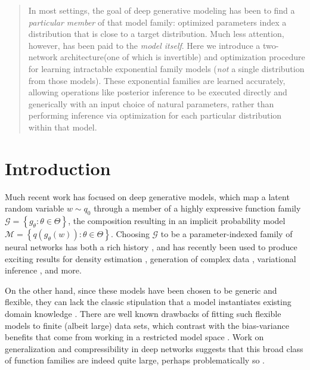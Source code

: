 \documentclass{article}
\begin{document}
\begin{abstract}
In most settings, the goal of deep generative modeling has been to find a \emph{particular member} of that model family: optimized parameters index a distribution that is close to a target distribution.  Much less attention, however, has been paid to the \emph{model itself}.   Here we introduce a two-network architecture(one of which is invertible) and optimization procedure for learning intractable exponential family models (\emph{not} a single distribution from those models).  These exponential families are learned accurately, allowing operations like posterior inference to be executed directly and generically with an input choice of natural parameters, rather than performing inference via optimization for each particular distribution within that model.
\end{abstract}

\section{Introduction}
Much recent work has focused on deep generative models, which map a latent random variable $w\sim q_0$ through a member of a highly expressive function family $\mathcal{G} = \left\{g_\theta : \theta \in \Theta\right\}$, the composition resulting in an implicit probability model $\mathcal{M} = \left\{ q(g_\theta (w)) : \theta \in \Theta \right\}$.  Choosing $\mathcal{G}$ to be a parameter-indexed family of neural networks has both a rich history \citep{dayan1995helmholtz,mackay1997density}, and has recently been used to produce exciting results for density estimation \citep{uria2013rnade, rippel2013high, papamakarios2017masked}, generation of complex data \citep{Goodfellow:2014aa}, variational inference \citep{Kingma:2013aa, rezende2014stochastic, titsias2014doubly}, and more.

On the other hand, since these models have been chosen to be generic and flexible, they can lack the classic stipulation that a model instantiates existing domain knowledge \citep{gelman2014bayesian, tenenbaum2006theory, mccullagh2002}.  There are well known drawbacks of fitting such flexible models to finite (albeit large) data sets, which contrast with the bias-variance benefits that come from working in a restricted model space \citep[\S 7.3]{friedman2001elements}.  Work on generalization and compressibility in deep networks suggests that this broad class of function families are indeed quite large, perhaps problematically so \citep{zhou2018compressibility}.  
\end{document}
